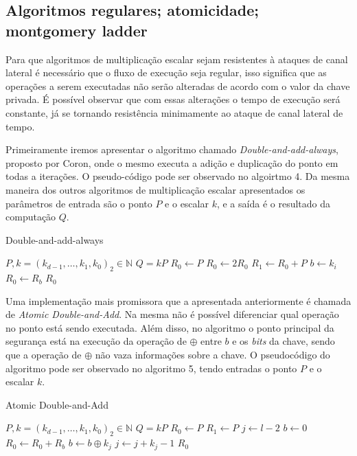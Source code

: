 \subsection{Algoritmos regulares; atomicidade; montgomery ladder}
Para que algoritmos de multiplicação escalar sejam resistentes à ataques de canal lateral é necessário que o fluxo de execução seja regular, isso significa que as operações a serem executadas não serão alteradas de acordo com o valor da chave privada. É possível observar que com essas alterações o tempo de execução será constante, já se tornando resistência minimamente ao ataque de canal lateral de tempo.

Primeiramente iremos apresentar o algoritmo chamado \textit{Double-and-add-always}, proposto por Coron, onde o mesmo executa a adição e duplicação do ponto em todas a iterações. O pseudo-código pode ser observado no algoirtmo 4. Da mesma maneira dos outros algoritmos de multiplicação escalar apresentados os parâmetros de entrada são o ponto $P$ e o escalar $k$, e a saída é o resultado da computação $Q$.

\begin{algorithm}[H]
\caption{Double-and-add-always}
\begin{algorithmic} 
    \REQUIRE $P, k=(k_{d-1},\ldots,k_1,k_0)_2 \in \mathbb{N}$
    \ENSURE $Q = kP$
    \STATE $R_0 \leftarrow P$
        \STATE $R_0 \leftarrow 2R_0$
        \STATE $R_1 \leftarrow R_0 + P$
        \STATE $b \leftarrow k_{i}$
        \STATE $R_0 \leftarrow R_b$
    \ENDFOR
    \RETURN $R_0$
    \end{algorithmic}
\end{algorithm}

Uma implementação mais promissora que a apresentada anteriormente é chamada de \textit{Atomic Double-and-Add}. Na mesma não é possível diferenciar qual operação no ponto está sendo executada. Além disso, no algoritmo o ponto principal da segurança está na execução da operação de $\oplus$ entre $b$ e os \textit{bits} da chave, sendo que a operação de $\oplus$ não vaza informações sobre a chave. O pseudocódigo do algoritmo pode ser observado no algoritmo 5, tendo entradas o ponto $P$ e o escalar $k$.

\begin{algorithm}[H]
\caption{Atomic Double-and-Add}
\begin{algorithmic} 
    \REQUIRE $P, k=(k_{d-1},\ldots,k_1,k_0)_2 \in \mathbb{N}$
    \ENSURE $Q = kP$
    \STATE $R_0 \leftarrow P$
    \STATE $R_1 \leftarrow P$
    \STATE $j \leftarrow l - 2$
    \STATE $b \leftarrow 0$
        \STATE $R_0 \leftarrow R_0 + R_b$
        \STATE $b \leftarrow b \oplus k_j$
        \STATE $j \leftarrow j + k_j -1$
    \ENDWHILE
    \RETURN $R_0$
    \end{algorithmic}
\end{algorithm}


